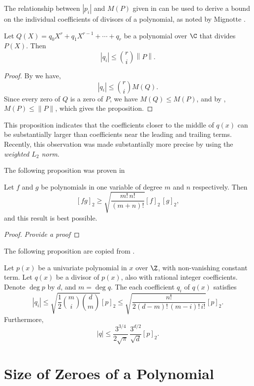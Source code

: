 The relationship between $|p_i|$ and $M(P)$ given in
 can be used to derive a bound on the
individual coefficients of divisors of a polynomial, as noted by
Mignotte \cite{Mignotte74}.  

\begin{proposition}[Mignotte]
Let $Q(X) = q_0 X^{r} + q_{1} X^{r-1} + \cdots + q_{r}$ be a
polynomial over $\C$ that divides $P(X)$.  Then
\[
\left| q_{i} \right| \le {r \choose i} \left\|P\right\|.
\]
\end{proposition}
\begin{proof}
By  we have,
\[
|q_i| \le {r \choose i} M(Q).
\]
Since every zero of $Q$ is a zero of $P$, we have $M(Q) \le M(P)$, and
by , $M(P) \le \|P\|$, which gives the
proposition. 
\end{proof}

This proposition indicates that the coefficients closer to the middle
of $q(x)$ can be substantially larger than coefficients near the
leading and trailing terms.  Recently, this observation was made
substantially more precise by using the {\em weighted $L_2$ norm}.

The following proposition was proven in \cite{Beauzamy90}

\begin{proposition}
Let $f$ and $g$ be polynomials in one variable of degree $m$ and $n$
respectively.  Then
\[
[fg]_2 \ge \sqrt{\frac{m! \, n!}{(m+n)!}} [f]_2 \, [g]_2,
\]
and this result is best possible.
\end{proposition}

\begin{proof}
{\em Provide a proof}
\end{proof}

The following proposition are copied from \cite{Beauzamy92a}.

\begin{proposition} 
Let $p(x)$ be a univariate polynomial in $x$ over $\Z$, with
non-vanishing constant term.  Let $q(x)$ be a divisor of $p(x)$, also
with rational integer coefficients.  Denote $\deg p$ by $d$, and $m =
\deg q$.  The each coefficient $q_i$ of
$q(x)$ satisfies
\[
|q_i| \le \sqrt{\frac{1}{2} {m \choose i} {d \choose m}} [p]_2
   \le \sqrt{\frac{n!}{2(d-m)!\, (m-i)!\, i!}} [p]_2.
\]
Furthermore, 
\[
|q| \le \frac{3^{3/4}}{2\sqrt{\pi}}\, \frac{3^{d/2}}{\sqrt{d}} [p]_2.
\]
\end{proposition}


\section{Size of Zeroes of a Polynomial}
\label{PB:RootSize:Sec}

